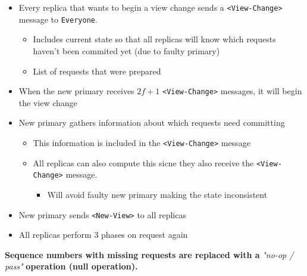 \documentclass{easyclass}
\begin{document}
\begin{prf}{}
    \begin{itemize}
        \item Every replica that  wants to begin a view change sends a
        \texttt{<View-Change>} message to \texttt{Everyone}.
        \begin{itemize}
            \item Includes current state so that all replicas will know which
            requests haven't been commited yet (due to faulty primary)
            \item List of requests that were prepared
        \end{itemize}
        \item When the new primary receives $2f+1$ \texttt{<View-Change>} messages,
        it will begin the view change
    \end{itemize}
\end{prf}
\newpage
\begin{prf}{}
    \begin{itemize}
        \item New primary gathers information about which requests need committing 
        \begin{itemize}
            \item This information is included in the \texttt{<View-Change>} message 
            \item All replicas can also compute this sicne they also receive the 
            \texttt{<View-Change>} message.
            \begin{itemize}
                \item Will avoid faulty new primary making the state inconsistent
            \end{itemize}
        \end{itemize}
        \item New primary sends \texttt{<New-View>} to all replicas
        \item All replicas perform 3 phases on request again
    \end{itemize}
\end{prf}

\begin{lem}{}
    \textbf{Sequence numbers with missing requests are replaced with a } \emph{"no-op / pass"} \textbf{operation (null operation).}
\end{lem}
\end{document}
